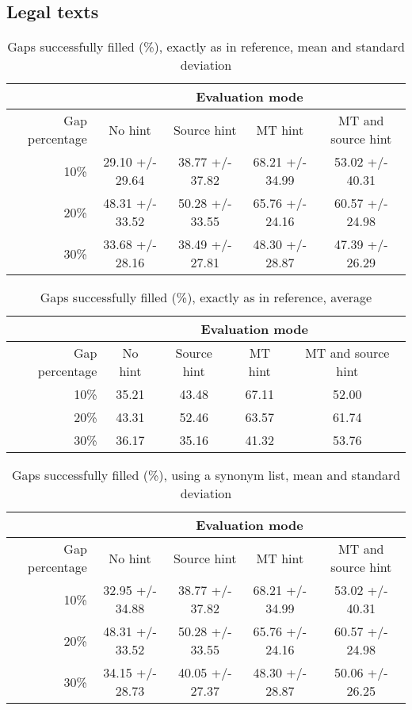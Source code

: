 \documentclass[11pt, oneside]{article}   	%
\begin{document}
\subsection{Legal texts}

\begin{table}[H]
\centering
\begin{tabular}{|r |*{4}{c}|}
\hline
 &\multicolumn{4}{c|}{Evaluation mode}\\
\hline
Gap percentage & No hint & Source hint & MT hint & MT and source hint\\
\hline
10\%&29.10 +/- 29.64&38.77 +/- 37.82&68.21 +/- 34.99&53.02 +/- 40.31\\
20\%&48.31 +/- 33.52&50.28 +/- 33.55&65.76 +/- 24.16&60.57 +/- 24.98\\
30\%&33.68 +/- 28.16&38.49 +/- 27.81&48.30 +/- 28.87&47.39 +/- 26.29\\
\hline
\end{tabular}
\caption {Gaps successfully filled (\%), exactly as in reference, mean and standard deviation} \label{tab:title} 
\end{table}

\begin{table}[H]
\centering
\begin{tabular}{|r |*{4}{c}|}
\hline
 &\multicolumn{4}{c|}{Evaluation mode}\\
\hline
Gap percentage & No hint & Source hint & MT hint & MT and source hint\\
\hline
10\%&35.21&43.48&67.11&52.00\\
20\%&43.31&52.46&63.57&61.74\\
30\%&36.17&35.16&41.32&53.76\\
\hline
\end{tabular}
\caption {Gaps successfully filled (\%), exactly as in reference, average} \label{tab:title} 
\end{table}

\begin{table}[H]
\centering
\begin{tabular}{|r |*{4}{c}|}
\hline
 &\multicolumn{4}{c|}{Evaluation mode}\\
\hline
Gap percentage & No hint & Source hint & MT hint & MT and source hint\\
\hline
10\%&32.95 +/- 34.88&38.77 +/- 37.82&68.21 +/- 34.99&53.02 +/- 40.31\\
20\%&48.31 +/- 33.52&50.28 +/- 33.55&65.76 +/- 24.16&60.57 +/- 24.98\\
30\%&34.15 +/- 28.73&40.05 +/- 27.37&48.30 +/- 28.87&50.06 +/- 26.25\\
\hline
\end{tabular}
\caption {Gaps successfully filled (\%), using a synonym list, mean and standard deviation} \label{tab:title} 
\end{table}
\end{document}
